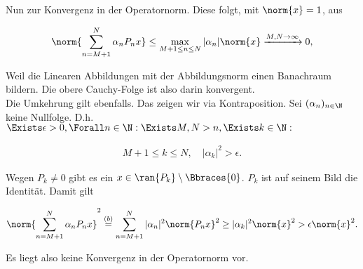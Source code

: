 \begin{solution}
Nun zur Konvergenz in der Operatornorm.
Diese folgt, mit $\norm{x} = 1$, aus

\begin{align*}
  \norm{\sum_{n=M+1}^N \alpha_n P_n x}
  \leq
  \max_{M+1 \leq n \leq N} |\alpha_n| \norm{x}
  \xrightarrow{M, N \to \infty} 0,
\end{align*}

Weil die Linearen Abbildungen mit der Abbildungsnorm einen Banachraum bildern.
Die obere Cauchy-Folge ist also darin konvergent. \\

Die Umkehrung gilt ebenfalls.
Das zeigen wir via Kontraposition.
Sei $(\alpha_n)_{n \in \N}$ keine Nullfolge.
D.h. $\Exists \epsilon > 0, \Forall n \in \N: \Exists M, N > n, \Exists k \in \N:$

\begin{align*}
  M+1 \leq k \leq N,
  \quad
  |\alpha_k|^2 > \epsilon.
\end{align*}

Wegen $P_k \neq 0$ gibt es ein $x \in \ran{P_k} \setminus \Bbraces{0}$.
$P_k$ ist auf seinem Bild die Identität.
Damit gilt

\begin{align*}
 \norm{\sum_{n = M+1}^N \alpha_n P_n x}^2
 \stackrel{(b)}{=}
 \sum_{n = M+1}^N |\alpha_n|^2 \norm{P_n x}^2
 \geq
 |\alpha_k|^2 \norm{x}^2
 >
 \epsilon \norm{x}^2.
\end{align*}

Es liegt also keine Konvergenz in der Operatornorm vor. \\

\end{solution}
